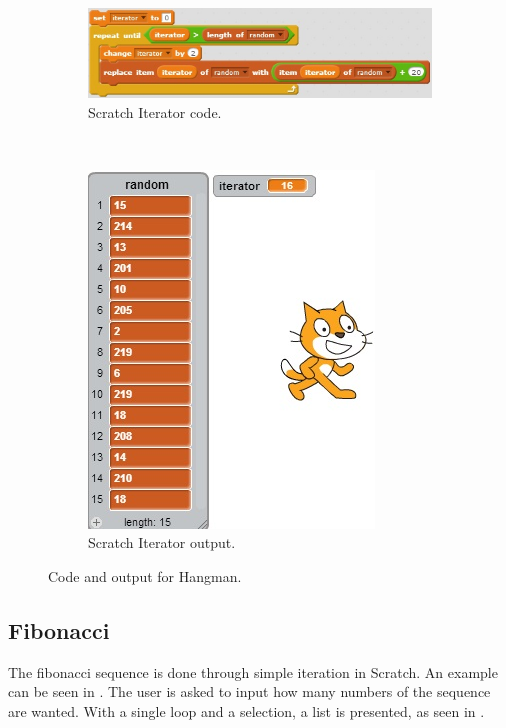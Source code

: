 \begin{figure}[h]
  \centering
    \begin{subfigure}[b]{0.45\textwidth}
    \begin{center}
      \includegraphics[scale=0.5]{./pics/scratch_iter_code}
      \caption{Scratch Iterator code.}
      \label{fig:scratch_iter_code}
    \end{center}
    \end{subfigure}
    ~
    \begin{subfigure}[b]{0.45\textwidth}
    \begin{center}
      \includegraphics[scale=0.5]{./pics/scratch_iter_out}
      \caption{Scratch Iterator output.}
      \label{fig:scratch_iter_out}
    \end{center}
    \end{subfigure}
    \caption{Code and output for Hangman.}
    \label{fig:scratch_iter}
\end{figure}

\subsection{Fibonacci}
The fibonacci sequence is done through simple iteration in Scratch. An example can be seen in . The user is asked to input how many numbers of the sequence are wanted. With a single loop and a selection, a list is presented, as seen in .

